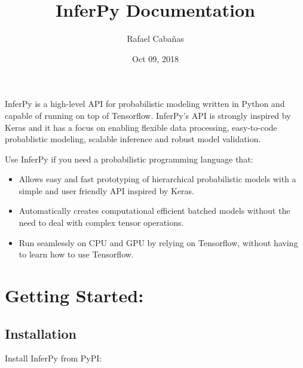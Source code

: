 \documentclass[letterpaper,10pt,english]{sphinxmanual}
\title{InferPy Documentation}
\date{Oct 09, 2018}
\author{Rafael Cabañas}
\begin{document}
\maketitle
\sphinxtableofcontents
{}\label{\detokenize{index::doc}}



\begin{DUlineblock}{0em}
\item[] 
\end{DUlineblock}

InferPy is a high-level API for probabilistic modeling written in Python and
capable of running on top of Tensorflow. InferPy’s API is
strongly inspired by Keras and it has a focus on enabling flexible data processing,
easy-to-code probablistic modeling, scalable inference and robust model validation.

Use InferPy if you need a probabilistic programming language that:
\begin{itemize}
\item {} 
Allows easy and fast prototyping of hierarchical probabilistic models with a simple and user friendly API inspired by Keras.

\item {} 
Automatically creates computational efficient batched models without the need to deal with complex tensor operations.

\item {} 
Run seamlessly on CPU and GPU by relying on Tensorflow, without having to learn how to use Tensorflow.

\end{itemize}


\chapter{Getting Started:}
\label{\detokenize{notes/getting30s:getting-started}}\label{\detokenize{notes/getting30s::doc}}\label{\detokenize{notes/getting30s:inferpy-probabilistic-modeling-with-tensorflow-made-easy}}

\section{Installation}
\label{\detokenize{notes/getting30s:installation}}
Install InferPy from PyPI:
\end{document}
